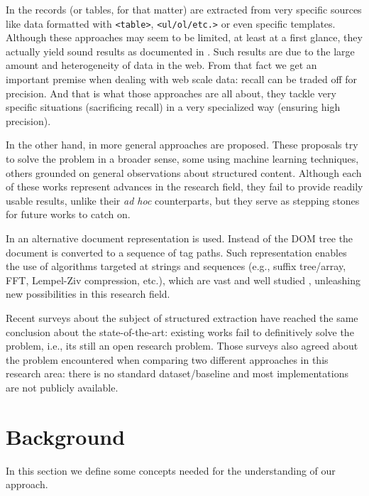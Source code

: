 \documentclass{vldb}
\begin{document}
In \cite{webtables2008, listExtract2009, tablesMS2012, tegra2015, topklists2013}
the records (or tables, for that matter) are extracted from very specific
sources like data formatted with \texttt{<table>}, \texttt{<ul/ol/etc.>} or even
specific templates. Although these approaches may seem to be limited, at least
at a first glance, they actually yield sound results as documented in
\cite{relationalWeb2008, probase, probase2012, acsdb}. Such results are due to
the large amount and heterogeneity of data in the web. From that fact we get an
important premise when dealing with web scale data: recall can be traded off for
precision. And that is what those approaches are all about, they tackle very
specific situations (sacrificing recall) in a very specialized way (ensuring
high precision).

In the other hand, in \cite{RRunner01, exalg2003, vips03, viper05, MDR03,
depta05, NET05, TPC09, vide10, gstm2010, fivatech2010, cvts2012, SuffixTree12,
clustVX2014, datapath2015, autorm2015} more general approaches are proposed.
These proposals try to solve the problem in a broader sense, some using machine
learning techniques, others grounded on general observations about structured
content. Although each of these works represent advances in the research field,
they fail to provide readily usable results, unlike their \textit{ad hoc}
counterparts, but they serve as stepping stones for future works to catch on.

In \cite{TPC09, SuffixTree12, TPS2013} an alternative document representation is
used. Instead of the DOM tree the document is converted to a sequence of tag
paths. Such representation enables the use of algorithms targeted at strings and
sequences (e.g., suffix tree/array\cite{ukkonen1995, manber1993suffix},
FFT\cite{fft1965}, Lempel-Ziv compression\cite{ziv1977universal}, etc.), which
are vast and well studied \cite{gusfield1997algorithms}, unleashing new
possibilities in this research field.

Recent surveys\cite{survey2013, survey2014} about the subject of structured
extraction have reached the same conclusion about the state-of-the-art: existing
works fail to definitively solve the problem, i.e., its still an open research
problem. Those surveys also agreed about the problem encountered when comparing
two different approaches in this research area: there is no standard
dataset/baseline and most implementations are not publicly available.

\section{Background}\label{sec:defs}
In this section we define some concepts needed for the understanding of our approach.
\end{document}
